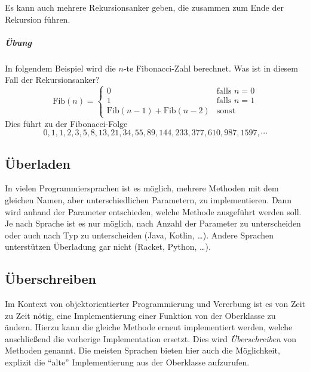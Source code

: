 		Es kann auch mehrere Rekursionsanker geben, die zusammen zum Ende der Rekursion führen.
		
		\subparagraph{Übung}
		In folgendem Beispiel wird die \(n\)-te Fibonacci-Zahl berechnet. Was ist in diesem Fall der Rekursionsanker?
		\begin{equation*}
			\text{Fib}(n) =
				\begin{cases}
					0                                     & \text{falls } n = 0 \\
					1                                     & \text{falls } n = 1 \\
					\text{Fib}(n - 1) + \text{Fib}(n - 2) & \text{sonst}
				\end{cases}
		\end{equation*}
		Dies führt zu der Fibonacci-Folge
		\begin{equation*}
			0, 1, 1, 2, 3, 5, 8, 13, 21, 34, 55, 89, 144, 233, 377, 610, 987, 1597, \cdots
		\end{equation*}

\subsection{Überladen} \functionalMark \imperativeMark \oopMark
	In vielen Programmiersprachen ist es möglich, mehrere Methoden mit dem gleichen Namen, aber unterschiedlichen Parametern, zu implementieren. Dann wird anhand der Parameter entschieden, welche Methode ausgeführt werden soll. Je nach Sprache ist es nur möglich, nach Anzahl der Parameter zu unterscheiden oder auch nach Typ zu unterscheiden (Java, Kotlin, \dots). Andere Sprachen unterstützen Überladung gar nicht (Racket, Python, \dots).

\subsection{Überschreiben} \oopMark
	Im Kontext von objektorientierter Programmierung und Vererbung ist es von Zeit zu Zeit nötig, eine Implementierung einer Funktion von der Oberklasse zu ändern. Hierzu kann die gleiche Methode erneut implementiert werden, welche anschließend die vorherige Implementation ersetzt. Dies wird \textit{Überschreiben} von Methoden genannt. Die meisten Sprachen bieten hier auch die Möglichkeit, explizit die \enquote{alte} Implementierung aus der Oberklasse aufzurufen.
